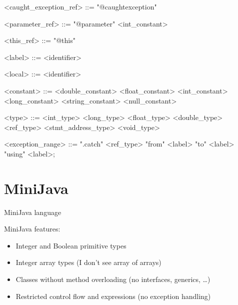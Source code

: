 \documentclass{report}
\newcommand{\minijava}{MiniJava\xspace}
\begin{document}
\begin{grammar}
<caught_exception_ref> ::= "@caughtexception"

<parameter_ref> ::= "@parameter" <int_constant>

<this_ref> ::= "@this"

<label> ::= <identifier>

<local> ::= <identifier>

<constant> ::= <double_constant> \alt <float_constant> \alt <int_constant> \alt <long_constant>  <string_constant> \alt <null_constant>

<type> ::= <int_type> \alt <long_type> \alt <float_type> \alt <double_type> \alt <ref_type> <stmt_address_type> \alt <void_type>

<exception_range> ::= ".catch" <ref_type> "from" <label> "to" <label> "using" <label>;

\end{grammar}




\appendix

\section{\minijava}
\label{sec:minijava}

\minijava language~\cite{miniJavaSyntax}

MiniJava features:
\begin{itemize}
\item Integer and Boolean primitive types
\item Integer array types (I don't see array of arrays)
\item Classes without method overloading (no interfaces, generics, \ldots)
\item Restricted control flow and expressions (no exception handling)
\end{itemize}
\end{document}
